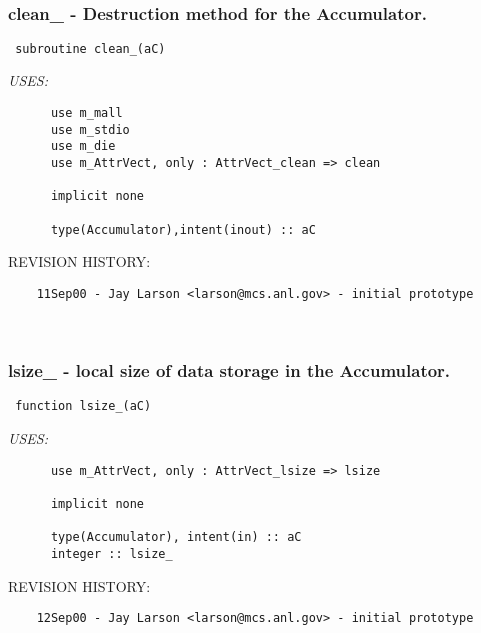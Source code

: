  
\mbox{}\hrulefill\ 
 

 \subsubsection{clean\_ - Destruction method for the Accumulator.}


 
 
\begin{verbatim} 
 subroutine clean_(aC)\end{verbatim}{\em USES:}
\begin{verbatim}      use m_mall
      use m_stdio
      use m_die
      use m_AttrVect, only : AttrVect_clean => clean
 
      implicit none
 
      type(Accumulator),intent(inout) :: aC
 \end{verbatim}{\sf REVISION HISTORY:}
\begin{verbatim}  	11Sep00 - Jay Larson <larson@mcs.anl.gov> - initial prototype\end{verbatim}
 
 
\mbox{}\hrulefill\ 
 

 \subsubsection{lsize\_ - local size of data storage in the Accumulator.}


 
 
\begin{verbatim} 
 function lsize_(aC)\end{verbatim}{\em USES:}
\begin{verbatim}      use m_AttrVect, only : AttrVect_lsize => lsize
 
      implicit none
 
      type(Accumulator), intent(in) :: aC
      integer :: lsize_
 \end{verbatim}{\sf REVISION HISTORY:}
\begin{verbatim}  	12Sep00 - Jay Larson <larson@mcs.anl.gov> - initial prototype\end{verbatim}
 
 
\mbox{}\hrulefill\ 
 

